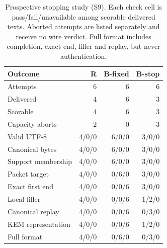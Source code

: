 \begin{table}[t]
\caption{Prospective stopping study (S9). Each check cell is pass/fail/unavailable among scorable delivered texts. Aborted attempts are listed separately and receive no wire verdict. Full format includes completion, exact end, filler and replay, but never authentication.}
\label{tab:predicates}
\centering\small
\begin{tabular}{lrrr}
\hline
Outcome & R & B-fixed & B-stop\\
\hline
Attempts & 6 & 6 & 6\\
Delivered & 4 & 6 & 3\\
Scorable & 4 & 6 & 3\\
Capacity aborts & 2 & 0 & 3\\
\hline
Valid UTF-8 & 4/0/0 & 6/0/0 & 3/0/0\\
Canonical bytes & 4/0/0 & 6/0/0 & 3/0/0\\
Support membership & 4/0/0 & 6/0/0 & 3/0/0\\
Packet target & 4/0/0 & 0/6/0 & 3/0/0\\
Exact first end & 4/0/0 & 0/0/6 & 3/0/0\\
Local filler & 4/0/0 & 0/0/6 & 1/2/0\\
Canonical replay & 4/0/0 & 0/0/6 & 0/3/0\\
KEM representation & 4/0/0 & 0/0/6 & 1/2/0\\
Full format & 4/0/0 & 0/6/0 & 0/3/0\\
\hline
\end{tabular}
\end{table}
